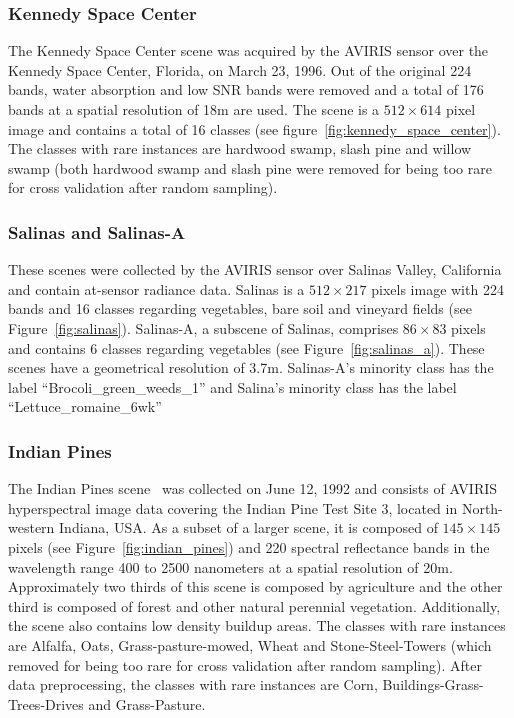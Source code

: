 \subsubsection*{Kennedy Space Center}

The Kennedy Space Center scene was acquired by the AVIRIS sensor over the
Kennedy Space Center, Florida, on March 23, 1996. Out of the original 224
bands, water absorption and low SNR bands were removed and a total of 176
bands at a spatial resolution of 18m are used. The scene is a $512 \times 614$
pixel image and contains a total of 16 classes (see
figure~\ref{fig:kennedy_space_center}). The classes with rare instances
are hardwood swamp, slash pine and willow swamp (both hardwood swamp and slash
pine were removed for being too rare for cross validation after random
sampling).

\subsubsection*{Salinas and Salinas-A}

These scenes were collected by the AVIRIS sensor over Salinas Valley,
California and contain at-sensor radiance data. Salinas is a $512 \times 217$
pixels image with 224 bands and 16 classes regarding vegetables, bare soil and
vineyard fields (see Figure~\ref{fig:salinas}). Salinas-A, a subscene of
Salinas, comprises $86 \times 83$ pixels and contains 6 classes regarding
vegetables (see Figure~\ref{fig:salinas_a}). These scenes have a geometrical
resolution of 3.7m. Salinas-A's minority class has the label
``Brocoli\_green\_weeds\_1'' and Salina's minority class has the label
``Lettuce\_romaine\_6wk''

\subsubsection*{Indian Pines} 

The Indian Pines scene~\cite{Baumgardner2015} was collected on June 12, 1992
and consists of AVIRIS hyperspectral image data covering the Indian Pine Test
Site 3, located in North-western Indiana, USA. As a subset of a larger scene,
it is composed of $145 \times 145$ pixels (see Figure~\ref{fig:indian_pines})
and 220 spectral reflectance bands in the wavelength range 400 to 2500
nanometers at a spatial resolution of 20m. Approximately two thirds of
this scene is composed by agriculture and the other third is composed of
forest and other natural perennial vegetation. Additionally, the scene also
contains low density buildup areas. The classes with rare instances are
Alfalfa, Oats, Grass-pasture-mowed, Wheat and Stone-Steel-Towers (which
removed for being too rare for cross validation after random sampling).  After
data preprocessing, the classes with rare instances are Corn,
Buildings-Grass-Trees-Drives and Grass-Pasture.

